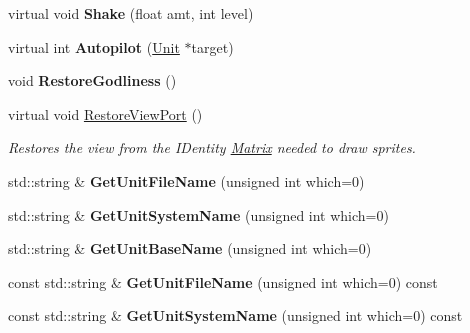 \begin{DoxyCompactItemize}
\item 
virtual void {\bfseries Shake} (float amt, int level)\hypertarget{classCockpit_a053728d5029c082f7e357b54ee713c84}{}\label{classCockpit_a053728d5029c082f7e357b54ee713c84}

\item 
virtual int {\bfseries Autopilot} (\hyperlink{classUnit}{Unit} $\ast$target)\hypertarget{classCockpit_a1222457e2ed20659ffd4b6cfeb278f4f}{}\label{classCockpit_a1222457e2ed20659ffd4b6cfeb278f4f}

\item 
void {\bfseries Restore\+Godliness} ()\hypertarget{classCockpit_a92125756dbde65a20d2f720ffbd244eb}{}\label{classCockpit_a92125756dbde65a20d2f720ffbd244eb}

\item 
virtual void \hyperlink{classCockpit_a507f3a179c90907af6f43c216358bcd7}{Restore\+View\+Port} ()\hypertarget{classCockpit_a507f3a179c90907af6f43c216358bcd7}{}\label{classCockpit_a507f3a179c90907af6f43c216358bcd7}

\begin{DoxyCompactList}\small\item\em Restores the view from the I\+Dentity \hyperlink{classMatrix}{Matrix} needed to draw sprites. \end{DoxyCompactList}\item 
std\+::string \& {\bfseries Get\+Unit\+File\+Name} (unsigned int which=0)\hypertarget{classCockpit_a16427591227a42993d19f5a0b4a060f4}{}\label{classCockpit_a16427591227a42993d19f5a0b4a060f4}

\item 
std\+::string \& {\bfseries Get\+Unit\+System\+Name} (unsigned int which=0)\hypertarget{classCockpit_ac6511b14d7657b9f0f2bfc05b605956c}{}\label{classCockpit_ac6511b14d7657b9f0f2bfc05b605956c}

\item 
std\+::string \& {\bfseries Get\+Unit\+Base\+Name} (unsigned int which=0)\hypertarget{classCockpit_adc62cc76c20fb94419d225925c2946e2}{}\label{classCockpit_adc62cc76c20fb94419d225925c2946e2}

\item 
const std\+::string \& {\bfseries Get\+Unit\+File\+Name} (unsigned int which=0) const \hypertarget{classCockpit_ad27011ea0c57586f5d7f6a6a81e4e93d}{}\label{classCockpit_ad27011ea0c57586f5d7f6a6a81e4e93d}

\item 
const std\+::string \& {\bfseries Get\+Unit\+System\+Name} (unsigned int which=0) const \hypertarget{classCockpit_af8fd64112a478971038d087de1518237}{}\label{classCockpit_af8fd64112a478971038d087de1518237}


\end{DoxyCompactItemize}

